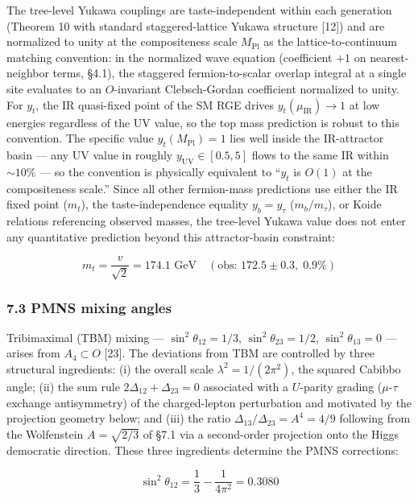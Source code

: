 \documentclass[
]{article}
\begin{document}
The tree-level Yukawa couplings are taste-independent within each
generation (Theorem 10 with standard staggered-lattice Yukawa structure
{[}12{]}) and are normalized to unity at the compositeness scale
\(M_{\text{Pl}}\) as the lattice-to-continuum matching convention: in
the normalized wave equation (coefficient \(+1\) on nearest-neighbor
terms, §4.1), the staggered fermion-to-scalar overlap integral at a
single site evaluates to an \(O\)-invariant Clebsch-Gordan coefficient
normalized to unity. For \(y_t\), the IR quasi-fixed point of the SM RGE
drives \(y_t(\mu_{\text{IR}}) \to 1\) at low energies regardless of the
UV value, so the top mass prediction is robust to this convention. The
specific value \(y_t(M_{\text{Pl}}) = 1\) lies well inside the
IR-attractor basin --- any UV value in roughly
\(y_{\text{UV}} \in [0.5, 5]\) flows to the same IR within \(\sim 10\%\)
--- so the convention is physically equivalent to ``\(y_t\) is \(O(1)\)
at the compositeness scale.'' Since all other fermion-mass predictions
use either the IR fixed point (\(m_t\)), the taste-independence equality
\(y_b = y_\tau\) (\(m_b/m_\tau\)), or Koide relations referencing
observed masses, the tree-level Yukawa value does not enter any
quantitative prediction beyond this attractor-basin constraint:

\[\boxed{m_t = \frac{v}{\sqrt{2}} = 174.1 \text{ GeV} \quad (\text{obs: } 172.5 \pm 0.3, \; 0.9\%)}\]

\hypertarget{pmns-mixing-angles}{%
\subsubsection{7.3 PMNS mixing angles}\label{pmns-mixing-angles}}

Tribimaximal (TBM) mixing --- \(\sin^2\theta_{12} = 1/3\),
\(\sin^2\theta_{23} = 1/2\), \(\sin^2\theta_{13} = 0\) --- arises from
\(A_4 \subset O\) {[}23{]}. The deviations from TBM are controlled by
three structural ingredients: (i) the overall scale
\(\lambda^2 = 1/(2\pi^2)\), the squared Cabibbo angle; (ii) the sum rule
\(2\Delta_{12} + \Delta_{23} = 0\) associated with a \(U\)-parity
grading (\(\mu\)-\(\tau\) exchange antisymmetry) of the charged-lepton
perturbation and motivated by the projection geometry below; and (iii)
the ratio \(\Delta_{13}/\Delta_{23} = A^4 = 4/9\) following from the
Wolfenstein \(A = \sqrt{2/3}\) of §7.1 via a second-order projection
onto the Higgs democratic direction. These three ingredients determine
the PMNS corrections:

\[\sin^2\theta_{12} = \frac{1}{3} - \frac{1}{4\pi^2} = 0.3080\]
\end{document}
